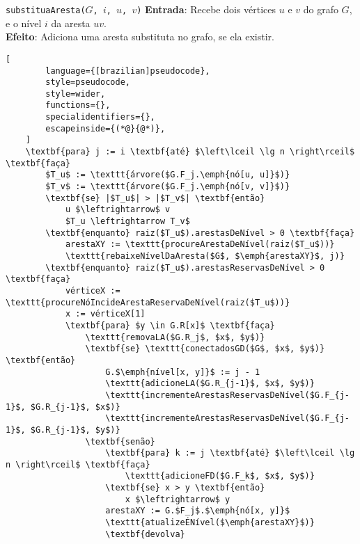 \begin{programruledcaption}{\texttt{substituaAresta($G$, $i$, $u$, $v$)} \label{prog:replaceGD}}
    \noindent\textbf{Entrada}: Recebe dois vértices $u$ e $v$ do grafo $G$, e o nível $i$ da aresta $uv$. \\
    \noindent\textbf{Efeito}: Adiciona uma aresta substituta no grafo, se ela existir.
    \vspace{-0.5\baselineskip}
    \begin{lstlisting}[
        language={[brazilian]pseudocode},
        style=pseudocode,
        style=wider,
        functions={},
        specialidentifiers={},
        escapeinside={(*@}{@*)},
    ]
    \textbf{para} j := i \textbf{até} $\left\lceil \lg n \right\rceil$ \textbf{faça}
        $T_u$ := \texttt{árvore($G.F_j.\emph{nó[u, u]}$)}
        $T_v$ := \texttt{árvore($G.F_j.\emph{nó[v, v]}$)}    
        \textbf{se} |$T_u$| > |$T_v$| \textbf{então}
            u $\leftrightarrow$ v
            $T_u \leftrightarrow T_v$
        \textbf{enquanto} raiz($T_u$).arestasDeNível > 0 \textbf{faça} 
            arestaXY := \texttt{procureArestaDeNível(raiz($T_u$))}
            \texttt{rebaixeNívelDaAresta($G$, $\emph{arestaXY}$, j)}
        \textbf{enquanto} raiz($T_u$).arestasReservasDeNível > 0     \textbf{faça}
            vérticeX := \texttt{procureNóIncideArestaReservaDeNível(raiz($T_u$))}
            x := vérticeX[1]
            \textbf{para} $y \in G.R[x]$ \textbf{faça}
                \texttt{removaLA($G.R_j$, $x$, $y$)} 
                \textbf{se} \texttt{conectadosGD($G$, $x$, $y$)} \textbf{então} 
                    G.$\emph{nível[x, y]}$ := j - 1
                    \texttt{adicioneLA($G.R_{j-1}$, $x$, $y$)}
                    \texttt{incrementeArestasReservasDeNível($G.F_{j-1}$, $G.R_{j-1}$, $x$)}
                    \texttt{incrementeArestasReservasDeNível($G.F_{j-1}$, $G.R_{j-1}$, $y$)}
                \textbf{senão}
                    \textbf{para} k := j \textbf{até} $\left\lceil \lg n \right\rceil$ \textbf{faça}
                        \texttt{adicioneFD($G.F_k$, $x$, $y$)}
                    \textbf{se} x > y \textbf{então}
                        x $\leftrightarrow$ y
                    arestaXY := G.$F_j$.$\emph{nó[x, y]}$
                    \texttt{atualizeÉNível($\emph{arestaXY}$)}
                    \textbf{devolva}
    \end{lstlisting}
    \vspace{-0.5\baselineskip}
\end{programruledcaption}

